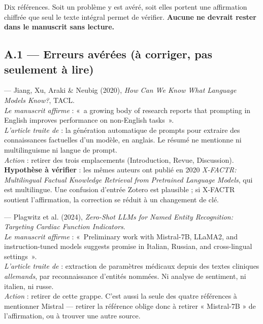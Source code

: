 \documentclass[11pt,a4paper]{article}
\newcommand{\ko}{\textcolor{crit}{\textbf{$\times$}}}
\newcommand{\cle}[1]{\texttt{\small #1}}
\begin{document}
Dix références. Soit un problème y est avéré, soit elles portent une affirmation
chiffrée que seul le texte intégral permet de vérifier. \textbf{Aucune ne devrait
rester dans le manuscrit sans lecture.}

\subsection*{A.1 --- Erreurs avérées (à corriger, pas seulement à lire)}

\begin{description}[leftmargin=0pt,style=unboxed]

\item[\ko~\cle{Jiang2020How}] --- Jiang, Xu, Araki \& Neubig (2020),
\emph{How Can We Know What Language Models Know?}, TACL.\\
\textit{Le manuscrit affirme} : «~a growing body of research reports that
prompting in English improves performance on non-English tasks~».\\
\textit{L'article traite de} : la génération automatique de prompts pour
extraire des connaissances factuelles d'un modèle, en anglais. Le résumé ne
mentionne ni multilinguisme ni langue de prompt.\\
\textit{Action} : retirer des trois emplacements (Introduction, Revue,
Discussion). \textbf{Hypothèse à vérifier} : les mêmes auteurs ont publié en
2020 \emph{X-FACTR: Multilingual Factual Knowledge Retrieval from Pretrained
Language Models}, qui est multilingue. Une confusion d'entrée Zotero est
plausible ; si X-FACTR soutient l'affirmation, la correction se réduit à un
changement de clé.

\item[\ko~\cle{Plagwitz2024Zero}] --- Plagwitz et al. (2024), \emph{Zero-Shot
LLMs for Named Entity Recognition: Targeting Cardiac Function Indicators}.\\
\textit{Le manuscrit affirme} : «~Preliminary work with Mistral-7B, LLaMA2, and
instruction-tuned models suggests promise in Italian, Russian, and cross-lingual
settings~».\\
\textit{L'article traite de} : extraction de paramètres médicaux depuis des
textes cliniques \emph{allemands}, par reconnaissance d'entités nommées. Ni
analyse de sentiment, ni italien, ni russe.\\
\textit{Action} : retirer de cette grappe. C'est aussi la seule des quatre
références à mentionner Mistral --- retirer la référence oblige donc à retirer
« Mistral-7B » de l'affirmation, ou à trouver une autre source.


\end{description}
\end{document}
